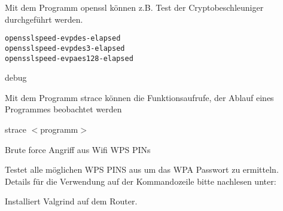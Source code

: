 \begin{description}


    Mit dem Programm openssl können z.B. Test der Cryptobeschleuniger durchgeführt werden.

\begin{example}
\begin{alltt}
openssl speed -evp des -elapsed
openssl speed -evp des3 -elapsed
openssl speed -evp aes128 -elapsed
\end{alltt}
\end{example}

 debug

    Mit dem Programm strace können die Funktionsaufrufe, der Ablauf eines
    Programmes beobachtet werden

    strace $<$programm$>$

 Brute force Angriff aus Wifi WPS PINs

    Testet alle möglichen WPS PINS aus um das WPA Passwort zu
    ermitteln. Details für die Verwendung auf der Kommandozeile bitte
    nachlesen unter: \\

        Installiert Valgrind auf dem Router.

\end{description}
